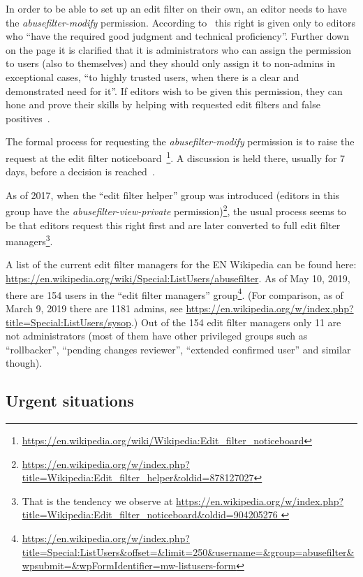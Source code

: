In order to be able to set up an edit filter on their own, an editor needs to have the \emph{abusefilter-modify} permission.
According to~\cite{Wikipedia:EditFilter} this right is given only to editors who ``have the required good judgment and technical proficiency''.
Further down on the page it is clarified that it is administrators who can assign the permission to users (also to themselves) and they should only assign it to non-admins in exceptional cases, ``to highly trusted users, when there is a clear and demonstrated need for it''.
If editors wish to be given this permission, they can hone and prove their skills by helping with requested edit filters and false positives~\cite{Wikipedia:EditFilter}.

The formal process for requesting the \emph{abusefilter-modify} permission is to raise the request at the edit filter noticeboard~\footnote{\url{https://en.wikipedia.org/wiki/Wikipedia:Edit_filter_noticeboard}}.
A discussion is held there, usually for 7 days, before a decision is reached~\cite{Wikipedia:EditFilter}.

As of 2017, when the ``edit filter helper'' group was introduced (editors in this group have the \emph{abusefilter-view-private} permission)\footnote{\url{https://en.wikipedia.org/w/index.php?title=Wikipedia:Edit_filter_helper&oldid=878127027}},
the usual process seems to be that editors request this right first and are later converted to full edit filter managers\footnote{That is the tendency we observe at \url{https://en.wikipedia.org/w/index.php?title=Wikipedia:Edit_filter_noticeboard&oldid=904205276 }}.

A list of the current edit filter managers for the EN Wikipedia can be found here: \url{https://en.wikipedia.org/wiki/Special:ListUsers/abusefilter}.
As of May 10, 2019, there are 154 users in the ``edit filter managers'' group\footnote{\url{https://en.wikipedia.org/w/index.php?title=Special:ListUsers&offset=&limit=250&username=&group=abusefilter&wpsubmit=&wpFormIdentifier=mw-listusers-form}}.
(For comparison, as of March 9, 2019 there are 1181 admins, see \url{https://en.wikipedia.org/w/index.php?title=Special:ListUsers/sysop}.)
Out of the 154 edit filter managers only 11 are not administrators (most of them have other privileged groups such as ``rollbacker'', ``pending changes reviewer'', ``extended confirmed user'' and similar though).


\subsection{Urgent situations}


